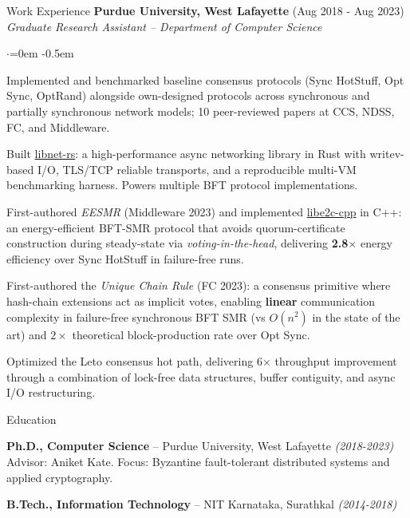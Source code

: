 \documentclass{resume}
\begin{document}
\begin{rSection}{Work Experience}
\textbf{Purdue University, West Lafayette}  \hfill  (Aug 2018 - Aug 2023)\\
\emph{Graduate Research Assistant -- Department of Computer Science}
\begin{list}{$\cdot$}{\leftmargin=0em}
\itemsep -0.5em \vspace{-0.5em}
 \item  Implemented and benchmarked baseline consensus protocols (Sync HotStuff, Opt Sync, OptRand) alongside own-designed protocols across synchronous and partially synchronous network models; 10 peer-reviewed papers at CCS, NDSS, FC, and Middleware.
 \item  Built \href{https://github.com/libdist-rs/libnet-rs}{libnet-rs}: a high-performance async networking library in Rust with writev-based I/O, TLS/TCP reliable transports, and a reproducible multi-VM benchmarking harness. Powers multiple BFT protocol implementations.
 \item  First-authored \emph{EESMR} (Middleware 2023) and implemented \href{https://github.com/adithyabhatkajake/libe2c-cpp}{libe2c-cpp} in C++: an energy-efficient BFT-SMR protocol that avoids quorum-certificate construction during steady-state via \emph{voting-in-the-head}, delivering \textbf{2.8$\times$} energy efficiency over Sync HotStuff in failure-free runs.
 \item  First-authored the \emph{Unique Chain Rule} (FC 2023): a consensus primitive where hash-chain extensions act as implicit votes, enabling \textbf{linear} communication complexity in failure-free synchronous BFT SMR (vs \(O(n^2)\) in the state of the art) and \(2\times\) theoretical block-production rate over Opt Sync.
 \item  Optimized the Leto consensus hot path, delivering 6\(\times\) throughput improvement through a combination of lock-free data structures, buffer contiguity, and async I/O restructuring.
\end{list}
\vspace{0.5em}
\end{rSection}
\begin{rSection}{Education}
\label{sec:org0074490}
 \item  \textbf{Ph.D., Computer Science} -- Purdue University, West Lafayette  \hfill  \emph{(2018-2023)}\\
    Advisor: Aniket Kate. Focus: Byzantine fault-tolerant distributed systems and applied cryptography.

 \item  \textbf{B.Tech., Information Technology} -- NIT Karnataka, Surathkal  \hfill  \emph{(2014-2018)}
\end{rSection}
\end{document}
